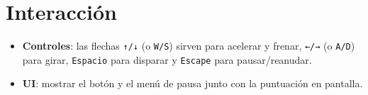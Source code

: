 \documentclass[12pt,twoside,letterpaper]{article}
\begin{document}
\section{Interacción}

\begin{itemize}
    \item \textbf{Controles}: las flechas \texttt{↑/↓} (o \texttt{W/S}) sirven para acelerar y frenar, \texttt{←/→} (o \texttt{A/D}) para girar, \texttt{Espacio} para disparar y \texttt{Escape} para pausar/reanudar.
    \item \textbf{UI}: mostrar el botón y el menú de pausa junto con la  puntuación en pantalla.
\end{itemize}
\end{document}
